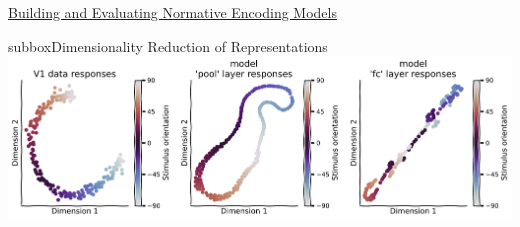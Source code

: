 \begin{textbox}{\href{https://compneuro.neuromatch.io/tutorials/W1D5_DeepLearning/student/W1D5_Tutorial3.html}{Building and Evaluating Normative Encoding Models } }
\begin{subbox}{subbox}{Dimensionality Reduction of Representations}
\centering
\includegraphics[scale=0.18]{Figures/DL/DLFigure7.png}

\end{subbox}
\end{textbox}